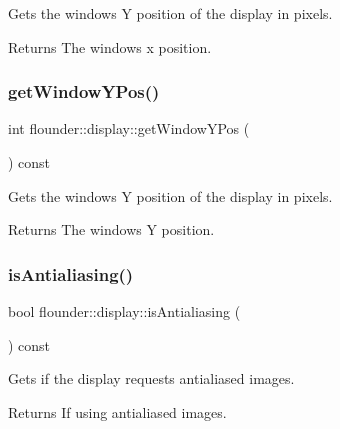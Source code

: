 Gets the windows Y position of the display in pixels. 

\begin{DoxyReturn}{Returns}
The windows x position. 
\end{DoxyReturn}
\mbox{\label{classflounder_1_1display_a9c0bb14dd6ffa98b4447d681fc4ca49b}} 
\subsubsection{\texorpdfstring{get\+Window\+Y\+Pos()}{getWindowYPos()}}
{\footnotesize\ttfamily int flounder\+::display\+::get\+Window\+Y\+Pos (\begin{DoxyParamCaption}{ }\end{DoxyParamCaption}) const\hspace{0.3cm}{\ttfamily [inline]}}



Gets the windows Y position of the display in pixels. 

\begin{DoxyReturn}{Returns}
The windows Y position. 
\end{DoxyReturn}
\mbox{\label{classflounder_1_1display_a79fd9d5571bb4bcd119240b8f919c491}} 
\subsubsection{\texorpdfstring{is\+Antialiasing()}{isAntialiasing()}}
{\footnotesize\ttfamily bool flounder\+::display\+::is\+Antialiasing (\begin{DoxyParamCaption}{ }\end{DoxyParamCaption}) const\hspace{0.3cm}{\ttfamily [inline]}}



Gets if the display requests antialiased images. 

\begin{DoxyReturn}{Returns}
If using antialiased images. 
\end{DoxyReturn}
\mbox{\label{classflounder_1_1display_ae198b698af936bc35d9e1dcf05acbe49}} 
